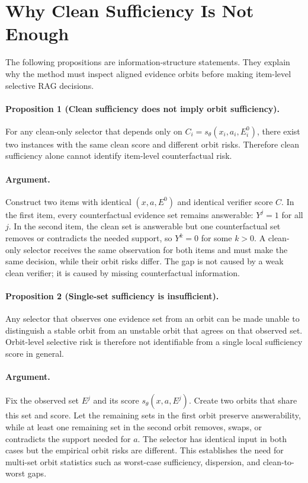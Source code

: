 \section{Why Clean Sufficiency Is Not Enough}
\label{sec:theory}

The following propositions are information-structure statements.  They explain
why the method must inspect aligned evidence orbits before making item-level
selective RAG decisions.

\paragraph{Proposition 1 (Clean sufficiency does not imply orbit sufficiency).}
\label{prop:clean-not-orbit}
For any clean-only selector that depends only on
$C_i=s_\theta(x_i,a_i,E_i^0)$, there exist two instances with the same clean
score and different orbit risks.  Therefore clean sufficiency alone cannot
identify item-level counterfactual risk.

\paragraph{Argument.}
Construct two items with identical $(x,a,E^0)$ and identical verifier score
$C$.  In the first item, every counterfactual evidence set remains answerable:
$Y^j=1$ for all $j$.  In the second item, the clean set is answerable but one
counterfactual set removes or contradicts the needed support, so $Y^k=0$ for
some $k>0$.  A clean-only selector receives the same observation for both items
and must make the same decision, while their orbit risks differ.  The gap is not
caused by a weak clean verifier; it is caused by missing counterfactual
information.

\paragraph{Proposition 2 (Single-set sufficiency is insufficient).}
\label{prop:single-set-not-orbit}
Any selector that observes one evidence set from an orbit can be made unable to
distinguish a stable orbit from an unstable orbit that agrees on that observed
set.  Orbit-level selective risk is therefore not identifiable from a single
local sufficiency score in general.

\paragraph{Argument.}
Fix the observed set $E^j$ and its score
$s_\theta(x,a,E^j)$.  Create two orbits that share this set and score.  Let the
remaining sets in the first orbit preserve answerability, while at least one
remaining set in the second orbit removes, swaps, or contradicts the support
needed for $a$.  The selector has identical input in both cases but the empirical
orbit risks are different.  This establishes the need for multi-set orbit
statistics such as worst-case sufficiency, dispersion, and clean-to-worst gaps.

